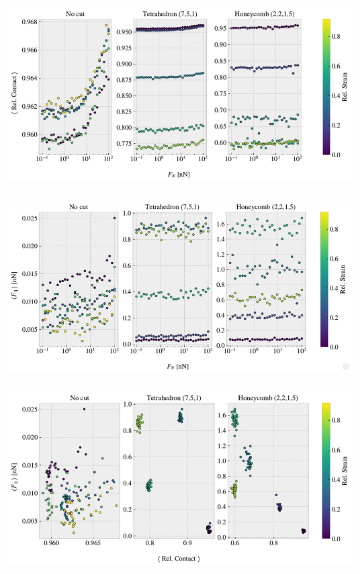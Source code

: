 \begin{figure}[H]
  \centering
  \begin{subfigure}[t]{0.8\textwidth}
      \centering
      \includegraphics[width=\textwidth]{figures/baseline/multi_FN_contact_compare.pdf}
      \caption{}
      \label{fig:multi_load_contact}
  \end{subfigure}
  \hfill
  \begin{subfigure}[t]{0.8\textwidth}
      \centering
      \includegraphics[width=\textwidth]{figures/baseline/multi_FN_mean_compare.pdf}
      \caption{}
      \label{fig:multi_load_fric}
  \end{subfigure}
  \begin{subfigure}[t]{0.8\textwidth}
      \centering
      \includegraphics[width=\textwidth]{figures/baseline/multi_FN_fric_contact_compare.pdf}

\end{subfigure}
\end{figure}
